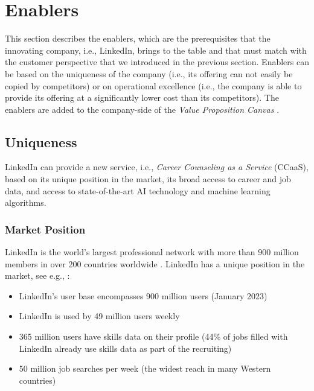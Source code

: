 \section{Enablers}
\label{sec:enablers}

This section describes the enablers, which are the prerequisites that the innovating company, i.e., LinkedIn, brings
to the table and that must match with the customer perspective that we introduced in the previous section. Enablers
can be based on the uniqueness of the company (i.e., its offering can not easily be copied by competitors) or on
operational excellence (i.e., the company is able to provide its offering at a significantly lower cost than its
competitors). The enablers are added to the company-side of the \emph{Value Proposition Canvas}
\citep{osterwalderValuePropositionDesign2014}.

\subsection{Uniqueness}

LinkedIn can provide a new service, i.e., \textit{Career Counseling as a Service} (CCaaS), based on its
unique position in the market, its broad access to career and job data, and access to state-of-the-art 
AI technology and machine learning algorithms.

\subsubsection{Market Position}

LinkedIn is the world's largest professional network with more than 900 million members in over 200 countries
worldwide \citep{linkedinLinkedInPressromUs2023}. LinkedIn has a unique position in the market, see e.g.,
\cite{kaserAIpoweredCareerCounseling2023,99firmsLinkedInStatistics20232023}: 

\begin{itemize}
    \item LinkedIn's user base encompasses 900 million users (January 2023)
    \item LinkedIn is used by 49 million users weekly
    \item 365 million users have skills data on their profile (44\% of jobs filled with
        LinkedIn already use skills data as part of the recruiting)
    \item 50 million job searches per week (the widest reach in many Western countries)
\end{itemize}

